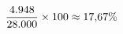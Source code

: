 \documentclass[preview]{standalone}
\begin{document}
\begin{align*}
\special{dvisvgm:raw <g id='unique000'>}\frac{4{.}948}{28{.}000} \times 100 \approx 17{,}67\%\special{dvisvgm:raw </g>}
\end{align*}
\end{document}
